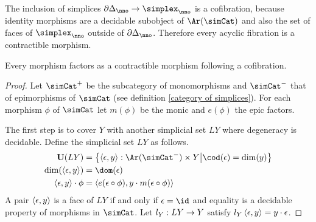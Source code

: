 \documentclass[csh.tex]{subfiles}
\begin{document}
\begin{example} The inclusion of simplices $\cycle_\nno\to\simplex_\nno$ is a cofibration, because identity morphisms are a decidable subobject of $\Ar(\simCat)$ and also the set of faces of $\simplex_\nno$ outside of $\cycle_\nno$. Therefore every acyclic fibration is a contractible morphism. \label{acyclic means contractible}\end{example}

\begin{proposition} Every morphism factors as a contractible morphism following a cofibration. \label{factor1} \end{proposition}

\begin{proof}
Let $\simCat^+$ be the subcategory of monomorphisms and $\simCat^-$ that of epimorphisms of $\simCat$ (see definition \ref{category of simplices}). For each morphism $\phi$ of $\simCat$ let $m(\phi)$ be the monic and $e(\phi)$ the epic factors.

The first step is to cover $Y$ with another simplicial set $LY$ where degeneracy is decidable. Define the simplicial set $LY$ as follows.
\begin{align*}
\base(LY) &= \set{\tuplet{\epsilon,y}\of \Ar(\simCat^-)\times Y\middle| \cod(\epsilon)=\dim(y)}\\
\dim(\tuplet{\epsilon,y}) &= \dom(\epsilon)\\
\tuplet{\epsilon,y}\cdot \phi &= \tuplet{e(\epsilon\circ \phi),y\cdot m(\epsilon\circ\phi)}
\end{align*}
A pair $\left\langle \epsilon,y \right\rangle$ is a face of $LY$ if and only if $\epsilon=\id$ and equality is a decidable property of morphisms in $\simCat$.
Let $l_Y: LY\to Y$ satisfy $l_Y\left\langle \epsilon,y \right\rangle=y\cdot\epsilon$.



\end{proof}
\end{document}
